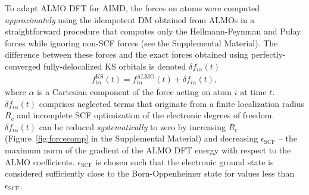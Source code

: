 \documentclass[aps,prl,reprint,amsmath,amssymb]{revtex4-1}
\begin{document}

To adapt ALMO DFT for AIMD, the forces on atoms were computed \emph{approximately} using the idempotent DM obtained from ALMOs in a straightforward procedure that computes only the Hellmann-Feynman and Pulay forces while ignoring non-SCF forces (see the Supplemental Material). 
The difference between these forces and the exact forces obtained using perfectly-converged fully-delocalized KS orbitals is denoted $\delta f_{i\alpha}(t)$ 
%
\begin{align}
\label{eq:deltaf}
f^{\text{KS}}_{i\alpha}(t) = f^{\text{ALMO}}_{i\alpha}(t) + \delta f_{i\alpha} (t),
\end{align}
%
where $\alpha$ is a Cartesian component of the force acting on atom $i$ at time $t$. $\delta f_{i\alpha} (t)$ comprises neglected terms that originate from %
a finite localization radius $R_c$ and incomplete SCF optimization of the electronic degrees of freedom. 
$\delta f_{i\alpha} (t)$ can be reduced \emph{systematically} to zero by increasing $R_c$ (Figure~\ref{fig:forcecomp} in the Supplemental Material) and decreasing $\epsilon_{\text{SCF}}$ -- the maximum norm of the gradient of the \mbox{ALMO} DFT energy with respect to the ALMO coefficients. $\epsilon_{\text{SCF}}$ is chosen such that the electronic ground state is considered sufficiently close to the Born-Oppenheimer state for values less than $\epsilon_{\text{SCF}}$.
\end{document}
